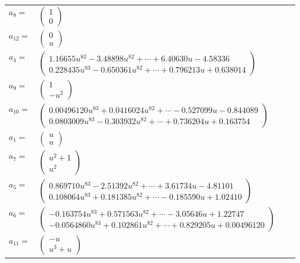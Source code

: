 \documentclass[1p]{elsarticle_modified}
\theoremstyle{definition}
\begin{document}
\begin{tabular}{m{7pt} m{180pt} m{7pt} m{180pt} }
\flushright $a_{8}=$&$\begin{pmatrix}1\\0\end{pmatrix}$ \\
\flushright $a_{12}=$&$\begin{pmatrix}0\\u\end{pmatrix}$ \\
\flushright $a_{4}=$&$\begin{pmatrix}1.16655 u^{83}-3.48898 u^{82}+\cdots+6.40630 u-4.58336\\0.228435 u^{83}-0.650361 u^{82}+\cdots+0.796213 u+0.638014\end{pmatrix}$ \\
\flushright $a_{9}=$&$\begin{pmatrix}1\\- u^2\end{pmatrix}$ \\
\flushright $a_{10}=$&$\begin{pmatrix}0.00496120 u^{83}+0.0416024 u^{82}+\cdots-0.527099 u-0.844089\\0.0803009 u^{83}-0.303932 u^{82}+\cdots+0.736204 u+0.163754\end{pmatrix}$ \\
\flushright $a_{1}=$&$\begin{pmatrix}u\\u\end{pmatrix}$ \\
\flushright $a_{7}=$&$\begin{pmatrix}u^2+1\\u^2\end{pmatrix}$ \\
\flushright $a_{5}=$&$\begin{pmatrix}0.869710 u^{83}-2.51392 u^{82}+\cdots+3.61734 u-4.81101\\0.108064 u^{83}+0.181385 u^{82}+\cdots-0.185590 u+1.02410\end{pmatrix}$ \\
\flushright $a_{6}=$&$\begin{pmatrix}-0.163754 u^{83}+0.571563 u^{82}+\cdots-3.05646 u+1.22747\\-0.0564860 u^{83}+0.102861 u^{82}+\cdots+0.829205 u+0.00496120\end{pmatrix}$ \\
\flushright $a_{11}=$&$\begin{pmatrix}- u\\u^3+u\end{pmatrix}$ \\

\end{tabular}
\end{document}
